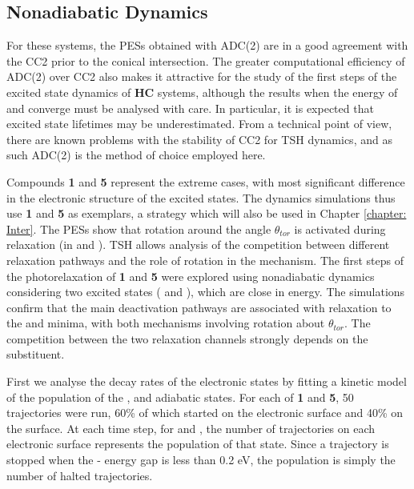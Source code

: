 \subsection{Nonadiabatic Dynamics}\label{section: NRdecay_Dynamics}
For these systems, the \sone{} \acp{PES} obtained with ADC(2) are in a good agreement with the CC2 prior to the conical intersection. The greater computational efficiency of ADC(2) over CC2 also makes it attractive for the study of the first steps of the excited state dynamics of \textbf{HC} systems, although the results when the energy of \sone{} and \szero{} converge must be analysed with care. In particular, it is expected that excited state lifetimes may be underestimated. From a technical point of view, there are known problems with the stability of CC2 for \ac{TSH} dynamics, and as such ADC(2) is the method of choice employed here.\cite{Plasser2014}

Compounds \textbf{1} and \textbf{5} represent the extreme cases, with most significant difference in the electronic structure of the excited states. The dynamics simulations thus use \textbf{1} and \textbf{5} as exemplars, a strategy which will also be used in Chapter \ref{chapter: Inter}.  The \acp{PES} show that rotation around the angle $\theta_{tor}$ is activated during relaxation (in \Estar{} and \Kstar{}). \ac{TSH} allows analysis of the competition between different relaxation pathways and the role of rotation in the mechanism. The first steps of the photorelaxation of \textbf{1} and \textbf{5} were explored using nonadiabatic dynamics considering two excited states (\stwo{} and \sone{}), which are close in energy. The simulations confirm that the main deactivation pathways are associated with relaxation to the \Kstar{} and \Estar{} minima, with both mechanisms involving  rotation about $\theta_{tor}$. The competition between the two relaxation channels strongly depends on the substituent. 

First we analyse the decay rates of the electronic states by fitting a kinetic model of the population of the \stwo{}, \sone{} and \szero{} adiabatic states. For each of \textbf{1} and \textbf{5}, 50 trajectories were run, 60\% of which started on the \sone{} electronic surface and 40\% on the \stwo{} surface. At each time step, for \stwo{} and \sone{}, the number of trajectories on each electronic surface represents the population of that state. Since a trajectory is stopped when the \sone{}-\szero{} energy gap is less than 0.2 eV, the \szero{} population is simply the number of halted trajectories. 

